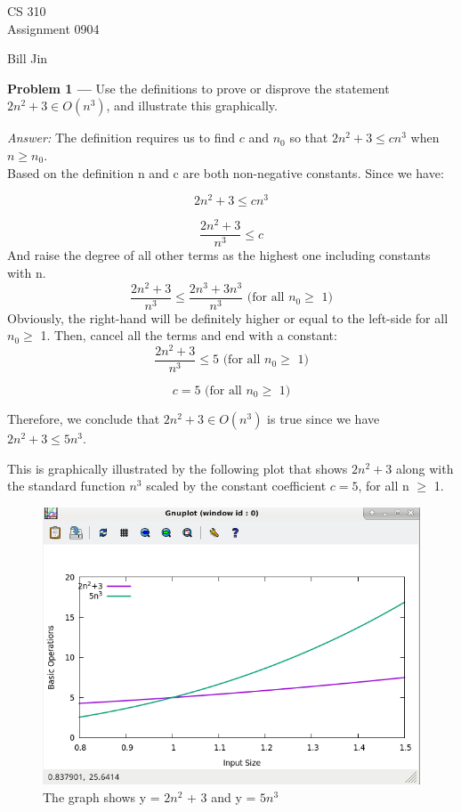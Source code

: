 \documentclass[11pt]{article}
\newcommand{\problem}[1]{\textbf{Problem #1 ---} }
\newcommand{\answer}{\textit{Answer: } }
\begin{document}
\thispagestyle{empty}

\begin{center}
{\large CS 310}\\
Assignment 0904
\end{center}

\begin{flushright}
Bill Jin
\end{flushright}

\problem{1} Use the definitions to prove or disprove the statement
$2n^2 + 3 \in O(n^3)$, and illustrate this graphically.

\answer The definition requires us to find $c$ and $n_0$ so that
$2n^2 + 3 \leq cn^3$ when $n \geq n_0$.\\
Based on the definition n and c are both non-negative constants. Since we have:

\[2n^2 + 3 \leq cn^3\]

\[ \frac{2n^2 + 3}{n^3} \leq c\]
And raise the degree of all other terms as the highest one including constants with n.
\[ \frac{2n^2 + 3}{n^3} \leq \frac{2n^3 + 3n^3}{n^3} \text{ (for all $n_0 \geq$ 1)}\]
Obviously, the right-hand will be definitely higher or equal to the left-side for all $n_0 \geq$ 1.
Then, cancel all the terms and end with a constant:
\[\frac{2n^2 + 3}{n^3} \leq 5 \text{ (for all $n_0 \geq$ 1)}\]

\[c = 5 \text{ (for all $n_0 \geq$ 1)}\]

Therefore, we conclude that $2n^2 + 3 \in O(n^3)$ is true since we have $2n^2 + 3 \leq 5n^3$.


This is graphically illustrated by the following plot that shows
$2n^2 + 3$ along with the standard function $n^3$ scaled by
the constant coefficient $c = 5$, for all n $\geq$ 1.

\begin{figure}[htbp]
\centerline{\includegraphics[scale = 0.3]{problem_1.png}}
\caption{The graph shows y = $2n^2$ + 3 and y = $5n^3$}
\label{fig}
\end{figure}
\end{document}
